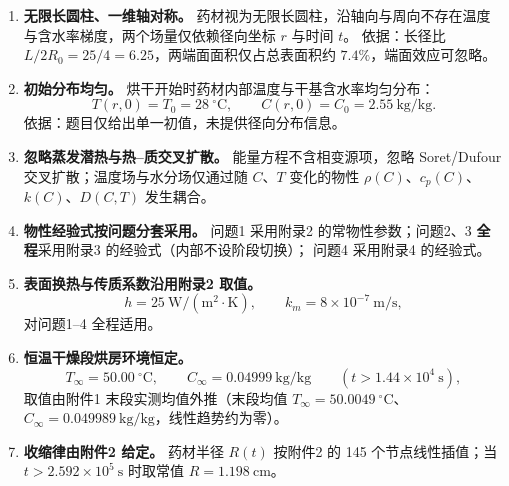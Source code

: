 
\begin{enumerate}[label=\textbf{假设\arabic*.},leftmargin=2.4em]

\item \textbf{无限长圆柱、一维轴对称。}
药材视为无限长圆柱，沿轴向与周向不存在温度与含水率梯度，两个场量仅依赖径向坐标 $r$ 与时间 $t$。
依据：长径比 $L/2R_0=25/4=6.25$，两端面面积仅占总表面积约 $7.4\%$，端面效应可忽略。

\item \textbf{初始分布均匀。}
烘干开始时药材内部温度与干基含水率均匀分布：
\begin{equation}
T(r,0)=T_0=28\ ^\circ\mathrm{C},\qquad C(r,0)=C_0=2.55\ \mathrm{kg/kg}.
\end{equation}
依据：题目仅给出单一初值，未提供径向分布信息。

\item \textbf{忽略蒸发潜热与热--质交叉扩散。}
能量方程不含相变源项，忽略 Soret/Dufour 交叉扩散；温度场与水分场仅通过随 $C$、$T$ 变化的物性
$\rho(C)$、$c_p(C)$、$k(C)$、$D(C,T)$ 发生耦合。

\item \textbf{物性经验式按问题分套采用。}
问题1 采用附录2 的常物性参数；问题2、3 \textbf{全程}采用附录3 的经验式（内部不设阶段切换）；
问题4 采用附录4 的经验式。

\item \textbf{表面换热与传质系数沿用附录2 取值。}
\begin{equation}
h=25\ \mathrm{W/(m^2\cdot K)},\qquad k_m=8\times10^{-7}\ \mathrm{m/s},
\end{equation}
对问题1--4 全程适用。

\item \textbf{恒温干燥段烘房环境恒定。}
\begin{equation}
T_\infty=50.00\ ^\circ\mathrm{C},\qquad C_\infty=0.04999\ \mathrm{kg/kg}\qquad (t>1.44\times10^{4}\ \mathrm{s}),
\end{equation}
取值由附件1 末段实测均值外推（末段均值 $T_\infty=50.0049\ ^\circ\mathrm{C}$、$C_\infty=0.049989\ \mathrm{kg/kg}$，线性趋势约为零）。

\item \textbf{收缩律由附件2 给定。}
药材半径 $R(t)$ 按附件2 的 145 个节点线性插值；当 $t>2.592\times10^{5}\ \mathrm{s}$ 时取常值 $R=1.198\ \mathrm{cm}$。


\end{enumerate}
